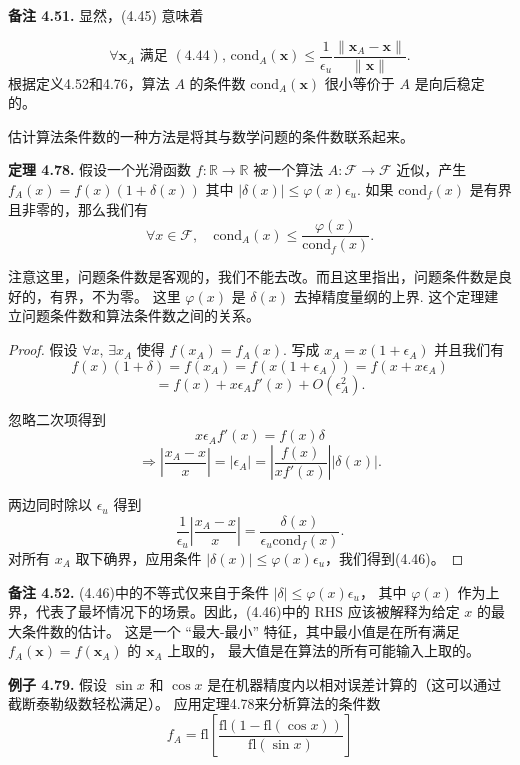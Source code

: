 \documentclass[a4paper]{ctexart}
\begin{document}
{\noindent \textbf{备注 4.51.} 显然，(4.45) 意味着

\[
  \forall \mathbf{x}_A \text{ 满足 } (4.44), \, \text{cond}_A(\mathbf{x}) \leq \frac{1}{\epsilon_u} \frac{\|\mathbf{x}_A - \mathbf{x}\|}{\|\mathbf{x}\|}.
\]
根据定义4.52和4.76，算法 \( A \) 的条件数 \( \text{cond}_A(\mathbf{x}) \) 很小等价于 \( A \) 是向后稳定的。

估计算法条件数的一种方法是将其与数学问题的条件数联系起来。

\noindent \textbf{定理 4.78. } 假设一个光滑函数 \( f: \mathbb{R} \rightarrow \mathbb{R} \) 
被一个算法 \( A: \mathcal{F} \rightarrow \mathcal{F} \) 近似，产生 \( f_A(x) = f(x)(1 + \delta(x)) \) 其中 
\( |\delta(x)| \leq \varphi(x) \epsilon_u \). 如果 \( \text{cond}_f(x) \) 是有界且非零的，那么我们有
\[
  \forall x \in \mathcal{F}, \quad \text{cond}_A(x) \leq \frac{\varphi(x)}{\text{cond}_f(x)}. \tag{4.46}
\]

注意这里，问题条件数是客观的，我们不能去改。而且这里指出，问题条件数是良好的，有界，不为零。
这里 $\varphi(x)$ 是 $\delta(x)$ 去掉精度量纲的上界.  这个定理建立问题条件数和算法条件数之间的关系。

\begin{proof}
假设 \( \forall x, \, \exists x_A \) 使得 \( f(x_A) = f_A(x) \). 写成 \( x_A = x(1 + \epsilon_A) \) 并且我们有
\[
  f(x)(1 + \delta) = f(x_A) = f(x(1 + \epsilon_A)) = f(x + x \epsilon_A)
\]
\[
  = f(x) + x \epsilon_A f'(x) + O(\epsilon_A^2).
\]
  
忽略二次项得到
\[
  x \epsilon_A f'(x) = f(x) \delta
\]
\[
  \Rightarrow \left| \frac{x_A - x}{x} \right| = |\epsilon_A| = \left| \frac{f(x)}{x f'(x)} \right| |\delta(x)|.
\]
  
两边同时除以 \( \epsilon_u \) 得到
\[
  \frac{1}{\epsilon_u} \left| \frac{x_A - x}{x} \right| = \frac{\delta(x)}{\epsilon_u \text{cond}_f(x)}.
\]
对所有 \( x_A \) 取下确界，应用条件 \( |\delta(x)| \leq \varphi(x) \epsilon_u \)，我们得到(4.46)。 
\end{proof}

\noindent \textbf{备注 4.52.} (4.46)中的不等式仅来自于条件 \( |\delta| \leq \varphi(x) \epsilon_u \)，
其中 \( \varphi(x) \) 作为上界，代表了最坏情况下的场景。因此，(4.46)中的 RHS 应该被解释为给定 \( x \) 的最大条件数的估计。
这是一个 ``最大-最小'' 特征，其中最小值是在所有满足 \( f_A(\mathbf{x}) = f(\mathbf{x}_A) \) 的 \( \mathbf{x}_A \) 上取的，
最大值是在算法的所有可能输入上取的。

\noindent \textbf{例子 4.79.} 假设 \( \sin x \) 和 \( \cos x \) 是在机器精度内以相对误差计算的（这可以通过截断泰勒级数轻松满足）。
应用定理4.78来分析算法的条件数
\[
  f_A = \text{fl} \left[ \frac{\text{fl}(1 - \text{fl}(\cos x))}{\text{fl}(\sin x)} \right]
\]

}
\end{document}
